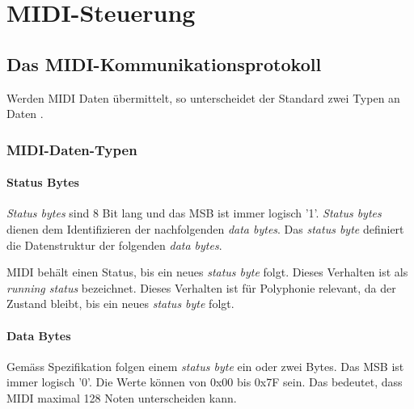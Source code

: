 
\chapter{MIDI-Steuerung}\label{chap.midi}

\section{Das MIDI-Kommunikationsprotokoll}\label{sect.midi_spezification}

Werden MIDI Daten übermittelt, so unterscheidet der Standard zwei Typen an Daten \citep{Midi_specification}.

\subsection{MIDI-Daten-Typen}\label{datenytpen}

\subsubsection*{Status Bytes}

\textit{Status bytes} sind 8 Bit lang und das MSB ist immer logisch '1'.  \textit{Status bytes} dienen dem Identifizieren der nachfolgenden \textit{data bytes}. Das \textit{status byte} definiert die Datenstruktur der folgenden \textit{data bytes}.

MIDI behält einen Status, bis ein neues \textit{status byte} folgt. Dieses Verhalten ist als \textit{running status} bezeichnet. Dieses Verhalten ist für Polyphonie relevant, da der Zustand bleibt, bis ein neues \textit{status byte} folgt.

\subsubsection*{Data Bytes}

Gemäss Spezifikation folgen einem \textit{status byte} ein oder zwei Bytes. Das MSB ist immer logisch '0'. Die Werte können von 0x00 bis 0x7F sein. Das bedeutet, dass MIDI maximal 128 Noten unterscheiden kann.

